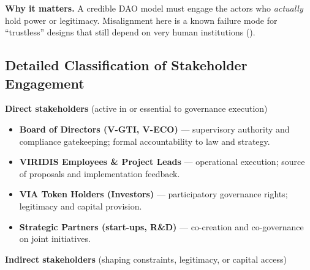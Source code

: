 \documentclass[
  english,
  12pt,
  oneside,
  open=any]{scrbook}
\providecommand{\tightlist}{%
  \setlength{\itemsep}{0pt}\setlength{\parskip}{0pt}}\usepackage{longtable,booktabs,array}
\begin{document}
\begin{tcolorbox}[enhanced jigsaw, colframe=quarto-callout-note-color-frame, coltitle=black, titlerule=0mm, opacitybacktitle=0.6, colback=white, toprule=.15mm, leftrule=.75mm, rightrule=.15mm, opacityback=0, toptitle=1mm, bottomtitle=1mm, bottomrule=.15mm, title=\textcolor{quarto-callout-note-color}{\faInfo}\hspace{0.5em}{Note}, arc=.35mm, left=2mm, colbacktitle=quarto-callout-note-color!10!white, breakable]

\textbf{Why it matters.} A credible DAO model must engage the actors who
\emph{actually} hold power or legitimacy. Misalignment here is a known
failure mode for ``trustless'' designs that still depend on very human
institutions ().

\end{tcolorbox}

\subsection{Detailed Classification of Stakeholder
Engagement}\label{sec-stakeholders-class}

\textbf{Direct stakeholders} (active in or essential to governance
execution)

\begin{itemize}
\tightlist
\item
  \textbf{Board of Directors (V-GTI, V-ECO)} --- supervisory authority
  and compliance gatekeeping; formal accountability to law and
  strategy.\\
\item
  \textbf{VIRIDIS Employees \& Project Leads} --- operational execution;
  source of proposals and implementation feedback.\\
\item
  \textbf{VIA Token Holders (Investors)} --- participatory governance
  rights; legitimacy and capital provision.\\
\item
  \textbf{Strategic Partners (start-ups, R\&D)} --- co-creation and
  co-governance on joint initiatives.
\end{itemize}

\textbf{Indirect stakeholders} (shaping constraints, legitimacy, or
capital access)
\end{document}
